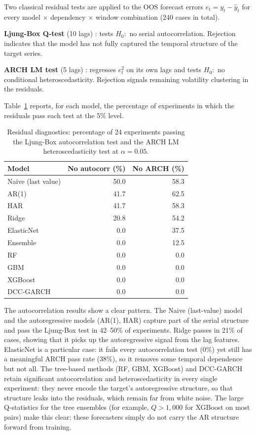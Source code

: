 Two classical residual tests are applied to the OOS forecast errors
$e_t = y_t - \hat{y}_t$ for every model $\times$ dependency $\times$ window
combination (240 cases in total).

\textbf{Ljung-Box Q-test} (10 lags) \cite{ljung1978measure}: tests $H_0{:}$ no serial autocorrelation.
Rejection indicates that the model has not fully captured the temporal structure
of the target series.

\textbf{ARCH LM test} (5 lags) \cite{engle1982arch}: regresses $e_t^2$ on its own lags and tests
$H_0{:}$ no conditional heteroscedasticity.
Rejection signals remaining volatility clustering in the residuals.

Table~\ref{tab:resid_summary} reports, for each model, the percentage of
experiments in which the residuals pass each test at the 5\% level.

\begin{table}[H]
    \centering
    \caption{Residual diagnostics: percentage of 24 experiments passing the
             Ljung-Box autocorrelation test and the ARCH LM heteroscedasticity
             test at $\alpha = 0.05$.}
    \label{tab:resid_summary}
    \begin{tabular}{lrr}
        \toprule
        Model & No autocorr (\%) & No ARCH (\%) \\
        \midrule
        Naive (last value) & 50.0 & 58.3 \\
        AR(1)         & 41.7 & 62.5 \\
        HAR         & 41.7 & 58.3 \\
        Ridge       & 20.8 & 54.2 \\
        ElasticNet  &  0.0 & 37.5 \\
        Ensemble    &  0.0 & 12.5 \\
        RF          &  0.0 &  0.0 \\
        GBM         &  0.0 &  0.0 \\
        XGBoost    &  0.0 &  0.0 \\
        DCC-GARCH  &  0.0 &  0.0 \\
        \bottomrule
    \end{tabular}
\end{table}

The autocorrelation results show a clear pattern. The Naive (last-value) model and the autoregressive models (AR(1), HAR) capture part of the serial structure and pass the Ljung-Box test in 42--50\% of experiments. Ridge passes in 21\% of cases, showing that it picks up the autoregressive signal from the lag features. ElasticNet is a particular case: it fails every autocorrelation test (0\%) yet still has a meaningful ARCH pass rate (38\%), so it removes some temporal dependence but not all. The tree-based methods (RF, GBM, XGBoost) and DCC-GARCH retain significant autocorrelation and heteroscedasticity in every single experiment: they never encode the target's autoregressive structure, so that structure leaks into the residuals, which remain far from white noise. The large Q-statistics for the tree ensembles (for example, $Q > 1{,}000$ for XGBoost on most pairs) make this clear: these forecasters simply do not carry the AR structure forward from training.

